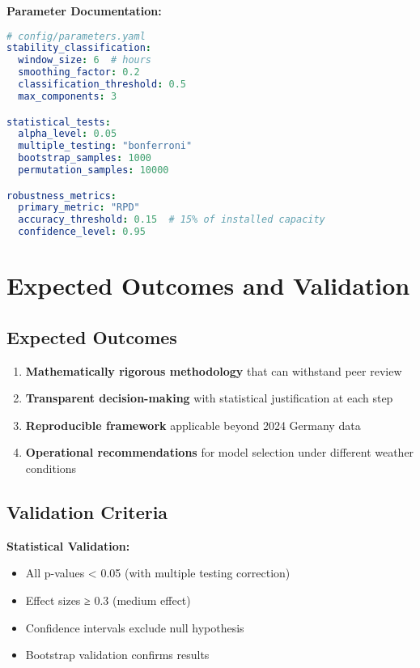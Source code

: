 \documentclass[11pt,a4paper]{article}
\begin{document}
\textbf{Parameter Documentation:}
\begin{lstlisting}[language=yaml]
# config/parameters.yaml
stability_classification:
  window_size: 6  # hours
  smoothing_factor: 0.2
  classification_threshold: 0.5
  max_components: 3

statistical_tests:
  alpha_level: 0.05
  multiple_testing: "bonferroni"
  bootstrap_samples: 1000
  permutation_samples: 10000

robustness_metrics:
  primary_metric: "RPD"
  accuracy_threshold: 0.15  # 15% of installed capacity
  confidence_level: 0.95
\end{lstlisting}

\section{Expected Outcomes and Validation}

\subsection{Expected Outcomes}

\begin{enumerate}
    \item \textbf{Mathematically rigorous methodology} that can withstand peer review
    \item \textbf{Transparent decision-making} with statistical justification at each step
    \item \textbf{Reproducible framework} applicable beyond 2024 Germany data
    \item \textbf{Operational recommendations} for model selection under different weather conditions
\end{enumerate}

\subsection{Validation Criteria}

\textbf{Statistical Validation:}
\begin{itemize}
    \item All p-values < 0.05 (with multiple testing correction)
    \item Effect sizes ≥ 0.3 (medium effect)
    \item Confidence intervals exclude null hypothesis
    \item Bootstrap validation confirms results
\end{itemize}
\end{document}

